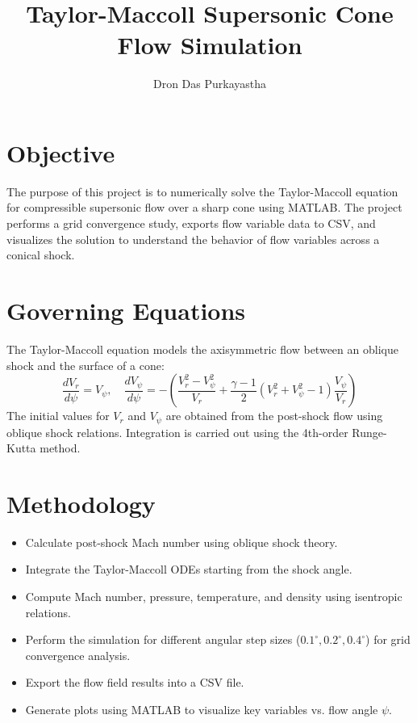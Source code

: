 \documentclass[12pt]{article}
\title{\textbf{Taylor-Maccoll Supersonic Cone Flow Simulation}}
\author{Dron Das Purkayastha}
\date{}
\begin{document}
\maketitle

\section*{Objective}
The purpose of this project is to numerically solve the Taylor-Maccoll equation for compressible supersonic flow over a sharp cone using MATLAB. The project performs a grid convergence study, exports flow variable data to CSV, and visualizes the solution to understand the behavior of flow variables across a conical shock.

\section*{Governing Equations}
The Taylor-Maccoll equation models the axisymmetric flow between an oblique shock and the surface of a cone:
\[
\frac{dV_r}{d\psi} = V_\psi, \quad
\frac{dV_\psi}{d\psi} = -\left( \frac{V_r^2 - V_\psi^2}{V_r} + \frac{\gamma - 1}{2}(V_r^2 + V_\psi^2 - 1)\frac{V_\psi}{V_r} \right)
\]
The initial values for \(V_r\) and \(V_\psi\) are obtained from the post-shock flow using oblique shock relations. Integration is carried out using the 4th-order Runge-Kutta method.

\section*{Methodology}
\begin{itemize}
    \item Calculate post-shock Mach number using oblique shock theory.
    \item Integrate the Taylor-Maccoll ODEs starting from the shock angle.
    \item Compute Mach number, pressure, temperature, and density using isentropic relations.
    \item Perform the simulation for different angular step sizes (\(0.1^\circ, 0.2^\circ, 0.4^\circ\)) for grid convergence analysis.
    \item Export the flow field results into a CSV file.
    \item Generate plots using MATLAB to visualize key variables vs. flow angle \(\psi\).
\end{itemize}
\end{document}

